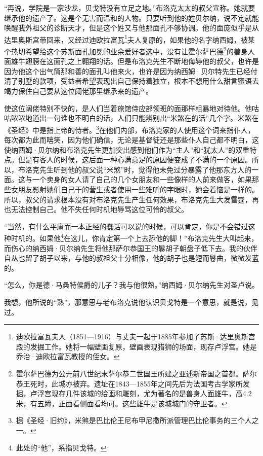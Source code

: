 \par “再说，学院是一家沙龙，贝戈特没有立足之地。”布洛克太太的叔父宣称。她就要继承他的遗产了。这是个无害而温和的人物。只要听到他的姓贝尔纳，说不定就能唤醒我外祖父的诊断天才，但是这个姓又与他那面孔不够协调。他的面庞似乎是从达里奥斯宫带回来，又经过迪欧拉富瓦\footnote{迪欧拉富瓦夫人（1851—1916）与丈夫一起于1885年参加了苏斯·达里奥斯宫殿的发掘工作。她将一幅壁画复原，壁画表现猎狮的场面，现存卢浮宫。她是乔治·迪欧拉富瓦教授的侄女。}夫人复原的，如果他的名字纳西姆，被某个热切希望给这个苏斯面孔加冕的业余爱好者选中，没有让霍尔萨巴德\footnote{霍尔萨巴德为公元前八世纪末萨尔恭二世国王所建之亚述新帝国之首都。萨尔恭王死时，此城亦被弃。遗址在1843—1855年之间先后为法国考古学家所发掘，卢浮宫现存几件该城的绘画和雕刻，尤为著名的是兽身人面雄牛，高4.2米，有五蹄，正面看侧面看均可。这些雄牛是该城城门的守卫者。}的兽身人面雄牛翅膀在这面孔之上翱翔的话。但是布洛克先生不断地侮辱他的叔父，也许是因为他这个出气筒那和善的面孔叫他来火，也许是因为纳西姆·贝尔特先生已经付清了别墅的款项，受益者希望表现出自己保持着独立，根本不想用什么甜言蜜语去竭力保住自己要从这位阔佬那里继承来的遗产。
\par 使这位阔佬特别不快的，是人们当着旅馆侍应部领班的面那样粗暴地对待他。他咕咕哝哝地道出一句谁也不明白的话，人们只能辨别出“米煞在的话”几个字。米煞在《圣经》中是指上帝的侍者。\footnote{据《圣经·旧约》，米煞是巴比伦王尼布甲尼撒所派管理巴比伦事务的三个人之一。}在他们内部，布洛克家的人使用这个词来指仆人，每次都为此而嘻笑，因为他们确信，无论是基督徒还是那些仆人自己都不明白，这使纳西姆·贝尔纳和布洛克先生更加突出感到他们作为“主人”和“犹太人”的双重特点。但是有客人的时候，这后面一种心满意足的原因便变成了不满的一个原因。所以，布洛克先生听到他的叔父说“米煞”时，觉得他未免过分暴露了他那东方人的一面。这与一个卖身的女人请了自己的几个女朋友和一些像样的人前来做客，如果那些女朋友影射她们自己干的营生或者使用一些难听的字眼时，她会着恼是一样的。所以，叔父的请求根本没有对布洛克先生产生任何效果，布洛克先生大发雷霆，再也无法控制自己。他不失任何时机地辱骂这位可怜的叔父。
\par “当然，有什么平庸而一本正经的蠢话可以说的时候，可以肯定，你是不会错过这种时机的。如果他\footnote{此处的“他”，系指贝戈特。}在这儿，你肯定第一个上去舔他的脚！”布洛克先生大叫起来，而伤心的纳西姆·贝尔纳先生将他那萨尔恭国王的鬈胡子朝盘子低下去。我的伙伴自从也留了胡子以来，与他的叔祖父十分相像，他的胡子也是短而鬈曲，微微发蓝的。
\par “怎么，你是德·马桑特侯爵的儿子？我与他很熟。”纳西姆·贝尔纳先生对圣卢说。
\par 我想，他所说的“熟”，那意思与老布洛克说他认识贝戈特是一个意思，就是说，见过。
